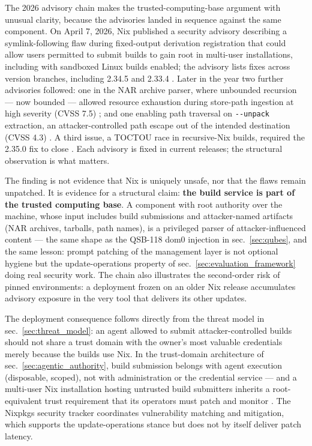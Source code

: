 \documentclass[
  english,
  9pt,
]{extarticle}
\begin{document}
The 2026 advisory chain makes the trusted-computing-base argument with
unusual clarity, because the advisories landed in sequence against the
same component. On April 7, 2026, Nix published a security advisory
describing a symlink-following flaw during fixed-output derivation
registration that could allow users permitted to submit builds to gain
root in multi-user installations, including with sandboxed Linux builds
enabled; the advisory lists fixes across version branches, including
2.34.5 and 2.33.4 \citep{nix_ghsa_g3g9}. Later in the year two further
advisories followed: one in the NAR archive parser, where unbounded
recursion --- now bounded --- allowed resource exhaustion during
store-path ingestion at high severity (CVSS 7.5) \citep{nix_ghsa_vh5x};
and one enabling path traversal on \texttt{-\/-unpack} extraction, an
attacker-controlled path escape out of the intended destination (CVSS
4.3) \citep{nix_ghsa_gr92}. A third issue, a TOCTOU race in
recursive-Nix builds, required the 2.35.0 fix to close
\citep{nix_ghsa_6h4g, nix_2_35_notes}. Each advisory is fixed in current
releases; the structural observation is what matters.

The finding is not evidence that Nix is uniquely unsafe, nor that the
flaws remain unpatched. It is evidence for a structural claim:
\textbf{the build service is part of the trusted computing base}. A
component with root authority over the machine, whose input includes
build submissions and attacker-named artifacts (NAR archives, tarballs,
path names), is a privileged parser of attacker-influenced content ---
the same shape as the QSB-118 dom0 injection in sec.~\ref{sec:qubes},
and the same lesson: prompt patching of the management layer is not
optional hygiene but the update-operations property of
sec.~\ref{sec:evaluation_framework} doing real security work. The chain
also illustrates the second-order risk of pinned environments: a
deployment frozen on an older Nix release accumulates advisory exposure
in the very tool that delivers its other updates.

The deployment consequence follows directly from the threat model in
sec.~\ref{sec:threat_model}: an agent allowed to submit
attacker-controlled builds should not share a trust domain with the
owner's most valuable credentials merely because the builds use Nix. In
the trust-domain architecture of sec.~\ref{sec:agentic_authority}, build
submission belongs with agent execution (disposable, scoped), not with
administration or the credential service --- and a multi-user Nix
installation hosting untrusted build submitters inherits a
root-equivalent trust requirement that its operators must patch and
monitor \citep{nix_ghsa_g3g9, nix_ghsa_vh5x}. The Nixpkgs security
tracker \citep{nixos_security_tracker} coordinates vulnerability
matching and mitigation, which supports the update-operations stance but
does not by itself deliver patch latency.
\end{document}
